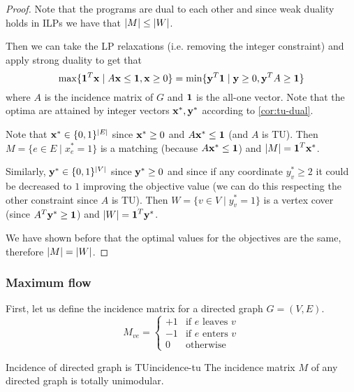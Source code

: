 \documentclass[12pt]{extarticle}
\renewcommand{\vec}[1]{\bvec{#1}}
\begin{document}
\begin{proof}
	Note that the programs are dual to each other and since weak duality holds in ILPs we have that
	$\abs{M} \leq \abs{W}$.

	Then we can take the LP relaxations (i.e. removing the integer constraint) and apply strong
	duality to get that
	\begin{equation}
		\max \{ \vec 1^T \vec x \mid A \vec x \leq \vec 1, \vec x \geq 0\} =
		\min \{ \vec y^T \vec 1 \mid \vec y \geq 0, \vec y^T A \geq \vec 1 \}
	\end{equation}
	where $A$ is the incidence matrix of $G$ and $\vec 1$ is the all-one vector.
	Note that the optima are attained by integer vectors $\vec x^*, \vec y^*$ according to
	\cref{cor:tu-dual}.

	Note that $\vec x^* \in \{0, 1\}^\abs{E}$ since $\vec x^* \geq 0$ and $A \vec x^* \leq \vec 1$
	(and $A$ is TU).
	Then $M = \{ e \in E \mid x^*_e = 1 \}$ is a matching (because $A \vec x^* \leq \vec 1$) and
	$\abs{M} = \vec 1^T \vec x^*$.

	Similarly, $\vec y^* \in \{0, 1\}^\abs{V}$ since $\vec y^* \geq 0$ and since if any coordinate
	$y^*_v \geq 2$ it could be decreased to $1$ improving the objective value (we can do this
	respecting the other constraint since $A$ is TU).
	Then $W = \{ v \in V \mid y^*_v = 1 \}$ is a vertex cover (since $A^T \vec y^* \geq \vec 1$) and
	$\abs{W} = \vec 1^T \vec y^*$.

	We have shown before that the optimal values for the objectives are the same, therefore
	$\abs{M}=\abs{W}$.
\end{proof}

\subsubsection{Maximum flow}

First, let us define the incidence matrix for a directed graph $G=(V, E)$.
\begin{equation}
	M_{ve} = \begin{cases}
		+1 & \text{if $e$ leaves $v$} \\
		-1 & \text{if $e$ enters $v$} \\
		0  & \text{otherwise}
	\end{cases}
\end{equation}

\begin{proposition}{Incidence of directed graph is TU}{incidence-tu}
	The incidence matrix $M$ of any directed graph is totally unimodular.
\end{proposition}
\end{document}

